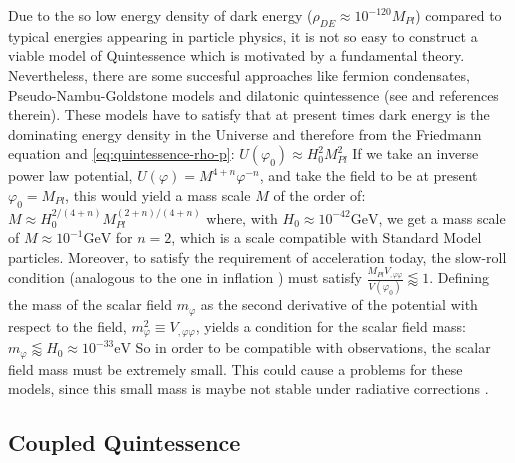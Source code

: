 Due to the so low energy density of dark energy ($\rho_{DE} \approx 10 ^{-120} M_{Pl}$)
compared to typical energies appearing in particle physics, it is not so easy to construct a 
viable model of Quintessence which is motivated by a fundamental theory. Nevertheless, there are 
some succesful approaches like fermion condensates, Pseudo-Nambu-Goldstone models and 
dilatonic quintessence (see \cite{amendola_dark_2010} and references therein).
These models have to satisfy that at present times dark energy is the dominating 
energy density in the Universe and therefore from the Friedmann equation and \cref{eq:quintessence-rho-p}:
\beeqp$
U(\varphi_0) \approx H_0^2 M_{Pl}^2
$
If we take an inverse power law potential, $U(\varphi) = M^{4+n} \varphi^{-n}$, and take the field to be at present $\varphi_0 = M_{Pl}$,
this would yield a mass scale $M$ of the order
of:
\beeqc$
M \approx H_0^{2/(4+n)} M_{Pl}^{(2+n)/(4+n)}
$
where, with $H_0 \approx 10^{-42} \mathrm{GeV} $, we get a mass scale of $M \approx 10^{-1} \mathrm{GeV}$
for $n=2$, which is a scale compatible with Standard Model particles.
Moreover, to satisfy the requirement of acceleration today, 
the slow-roll condition (analogous to the one in inflation ) must satisfy 
$ \frac{M_{Pl} V_{,\varphi \varphi}}{V(\varphi_0)} \lessapprox 1$.
Defining the mass of the scalar field $m_\varphi$ as the second derivative of the potential with respect to the field,
$m^2_\varphi \equiv  V_{,\varphi \varphi} $, yields a condition for the scalar field mass:
\beeqp$
m_\varphi \lessapprox H_0 \approx 10^{-33} \mathrm{eV}
$
So in order to be compatible with observations, 
the scalar field mass must be extremely small.
This could cause a problems for these models,
since this small mass is maybe not stable under radiative corrections
 .

\subsection{Coupled Quintessence \label{sub:CQ}}

